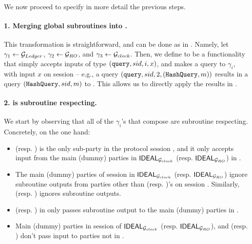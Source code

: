 We now proceed to specify in more detail the previous steps.

\paragraph{1. Merging global subroutines into \gAtala.} This transformation
is straightforward, and can be done as in \cite[Definition 4.1]{bhz21}. Namely,
let $\gamma_1 \gets \mathcal{G}_{Ledger}$, $\gamma_2 \gets \mathcal{G}_{RO}$, and $\gamma_3
\gets \mathcal{G}_{clock}$. Then, we define \gAtala to be a functionality that simply
accepts inputs of type $(\mathtt{query},sid,i,x)$, and makes a query to
$\gamma_i$, with input $x$ on session \sid -- e.g., a query $(\mathtt{query},
sid,2,(\mathtt{HashQuery},m))$ results in a query $(\mathtt{HashQuery},sid,m)$
to \IdealGRO.
%
This allows us to directly apply the results in \cite{bch+20}. 

\paragraph{2. \gAtala is subroutine respecting.} We start by observing that
all of the $\gamma_i$'s that compose \gAtala are subroutine respecting.
Concretely, on the one hand:

\begin{itemize}
\item \IdealGclock (resp. \IdealGRO) is the only sub-party in the protocol
  session \sid, and it only accepts input from the main (dummy) parties in
  $\mathsf{IDEAL}_{\mathcal{G}_{clock}}$ (resp. $\mathsf{IDEAL}_{\mathcal{G}_{RO}}$) in \sid.
\item The main (dummy) parties of session \sid in $\mathsf{IDEAL}_{\mathcal{G}_{clock}}$
  (resp. $\mathsf{IDEAL}_{\mathcal{G}_{RO}}$) ignore subroutine outputs from parties other
  than \IdealGclock (resp. \IdealGRO)'s on session \sid. Similarly,
  \IdealGclock (resp. \IdealGRO) ignores subroutine outputs.
\item \IdealGclock (resp. \IdealGRO) in \sid only passes subroutine output to
  the main (dummy) parties in \sid.
\item Main (dummy) parties in session \sid of $\mathsf{IDEAL}_{\mathcal{G}_{clock}}$ (resp.
  $\mathsf{IDEAL}_{\mathcal{G}_{RO}}$), and \IdealGclock (resp. \IdealGRO)  don't pass input
  to parties not in \sid. 
\end{itemize}

